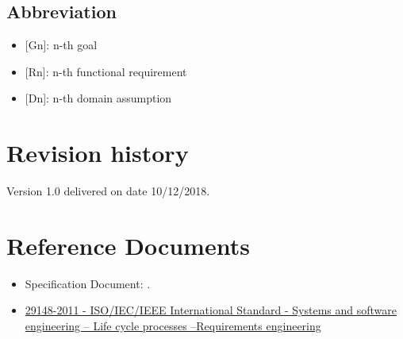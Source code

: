 \subsection{Abbreviation}
\begin{itemize}
    \item {[Gn]}: n-th goal
    \item {[Rn]}: n-th functional requirement
    \item {[Dn]}: n-th domain assumption
\end{itemize}

\section{Revision history}
Version 1.0 delivered on date 10/12/2018.

\section{Reference Documents}
\begin{itemize}
    \item Specification Document: . 
    \item \href{https://ieeexplore.ieee.org/document/6146379} {29148-2011 - ISO/IEC/IEEE International Standard - Systems and software engineering -- Life cycle processes --Requirements engineering}
\end{itemize}

